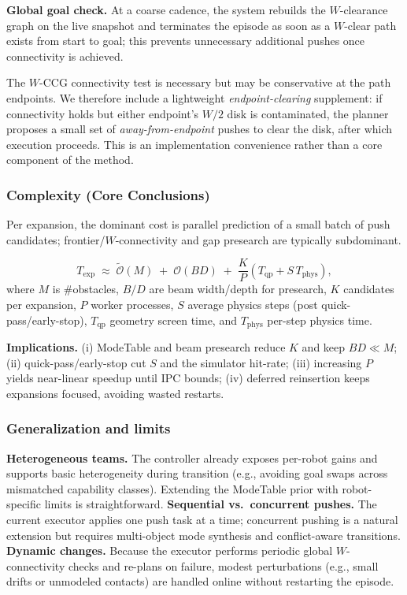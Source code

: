 \textbf{Global goal check.}
At a coarse cadence, the system rebuilds the $W$-clearance graph on the live
snapshot and terminates the episode as soon as a $W$-clear path exists from start
to goal; this prevents unnecessary additional pushes once connectivity is achieved.

\begin{remark}
The $W$-CCG connectivity test is necessary but may be conservative at the path
endpoints. We therefore include a lightweight \emph{endpoint-clearing} supplement:
if connectivity holds but either endpoint’s $W/2$ disk is contaminated, the planner
proposes a small set of \emph{away-from-endpoint} pushes to clear the disk, after
which execution proceeds. This is an implementation convenience rather than a core
component of the method.
\end{remark}

\subsubsection{Complexity (Core Conclusions)}\label{subsubsec:complexity}
Per expansion, the dominant cost is parallel prediction of a small batch of push
candidates; frontier/$W$-connectivity and gap presearch are typically subdominant.

\[
T_{\text{exp}} \;\approx\; \tilde{\mathcal O}(M) \;+\; \mathcal O(BD) \;+\; \frac{K}{P}\!\left(T_{\text{qp}} + S\,T_{\text{phys}}\right),
\]
where $M$ is \#obstacles, $B/D$ are beam width/depth for presearch, $K$ candidates per
expansion, $P$ worker processes, $S$ average physics steps (post quick-pass/early-stop),
$T_{\text{qp}}$ geometry screen time, and $T_{\text{phys}}$ per-step physics time.

\noindent\textbf{Implications.}
(i) ModeTable and beam presearch reduce $K$ and keep $BD\!\ll\!M$;
(ii) quick-pass/early-stop cut $S$ and the simulator hit-rate;
(iii) increasing $P$ yields near-linear speedup until IPC bounds;
(iv) deferred reinsertion keeps expansions focused, avoiding wasted restarts.

\subsubsection{Generalization and limits}\label{subsec:general}
\textbf{Heterogeneous teams.} The controller already exposes per-robot gains and
supports basic heterogeneity during transition (e.g., avoiding goal swaps across
mismatched capability classes). Extending the ModeTable prior with robot-specific
limits is straightforward. \textbf{Sequential vs.\ concurrent pushes.} The current
executor applies one push task at a time; concurrent pushing is a natural extension
but requires multi-object mode synthesis and conflict-aware transitions. \textbf{Dynamic
changes.} Because the executor performs periodic global $W$-connectivity checks and
re-plans on failure, modest perturbations (e.g., small drifts or unmodeled contacts)
are handled online without restarting the episode.
